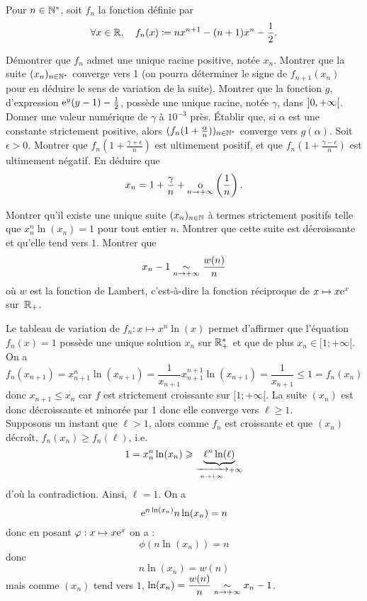 \documentclass{magnolia}
\begin{document}
Pour $n\in{\mathbb{N}^*}$, soit $f_n$ la fonction définie par 
\[\forall x\in\mathbb{R} ,\quad f_n(x)\coloneqq nx^{n+1}-(n+1)x^n-\frac{1}{2}.\]
\begin{questions}
\question Démontrer que $f_n$ admet une unique racine positive, notée $x_n$.
\question Montrer que la suite $(x_n)_{n\in{\mathbb{N}^*}}$ converge vers 1 (on pourra
  déterminer le signe de $f_{n+1}(x_n)$ pour en déduire le sens de variation de
  la suite).
\question Montrer que la fonction $g$, d'expression ${\rm e}^y(y-1)-\frac{1}{2}$,
  possède une unique racine, notée $\gamma$, dans $\left]0,+\infty\right[$. Donner
  une valeur numérique de $\gamma$ à $10^{-3}$ près.
\question Établir que, si $\alpha$ est une constante strictement positive,
  alors $(f_n(1+\frac{\alpha}{n}))_{n\in{\mathbb{N}^*}}$ converge vers $g(\alpha)$.
\question Soit $\epsilon>0$. Montrer que $f_n(1+\frac{\gamma+\epsilon}{n})$
  est ultimement positif, et que $f_n(1+\frac{\gamma-\epsilon}{n})$ est
  ultimement négatif.
\question En déduire que
  \[x_n=1+\frac{\gamma}{n}+\underset{n \rightarrow +\infty}{\text{o}}\left(\frac{1}{n}\right).\]
\end{questions}

\begin{questions}
\question Montrer qu'il existe une unique suite $(x_n)_{n\in\mathbb{N}}$ à termes
  strictement positifs telle que  $x_n^n\ln(x_n)=1$ pour tout entier $n$.
\question Montrer que cette suite est  décroissante et qu'elle tend vers $1$. 
\question Montrer que
  \[x_n-1\underset{n\rightarrow +\infty}{\sim}\frac{w(n)}{n}\]
  où $w$ est la fonction de Lambert, c'est-à-dire la fonction réciproque de
  $x\mapsto x{\rm e}^x$ sur~$\mathbb{R}_+$.
\end{questions}

\begin{sol}
\begin{questions}
\question Le tableau de variation de $f_n : x\mapsto x^n \ln (x)$ permet d'affirmer que l'équation
$f_n(x) = 1$ possède une unique solution $x_n$ sur $\mathbb{R}_+^*$ et que de plus $x_n \in [1;+\infty[$.
\question On a $$f_n(x_{n+1})=x_{n+1}^{n}\ln(x_{n+1})=\frac{1}{x_{n+1}}x_{n+1}^{n+1}\ln(x_{n+1})=\frac{1}{x_{n+1}}\leq 1=f_n(x_n)$$ donc $x_{n+1}\leq x_n$ car $f$ est strictement croissante sur $[1;+\infty[$. La suite $(x_n)$ est donc décroissante et minorée par $1$ donc elle converge vers $\ell \geq 1$. \\
Supposons un instant que $\ell>1$, alors comme $f_n$ est croissante et que $(x_n)$ décroît, $f_n(x_n)\geq f_n(\ell)$, i.e. $$1=x_n^n\ln(x_n)\geqslant \underbrace{\ell^n\ln(\ell)}_{\xrightarrow[n\rightarrow +\infty]{}+\infty}$$ d'où la contradiction. Ainsi, $\ell=1$.
\question On a $${\rm e}^{n\ln(x_n)}n\ln(x_n)=n$$ donc en posant $\varphi : x\mapsto x{\rm e}^x$ on a :
$$\phi(n\ln(x_n))=n$$ donc $$n\ln(x_n)=w(n)$$ mais comme $(x_n)$ tend vers $1$, $\ln(x_n)=\dfrac{w(n)}{n}\underset{n\rightarrow +\infty}{\sim}x_n-1$.
\end{questions}
\end{sol}
\end{document}
